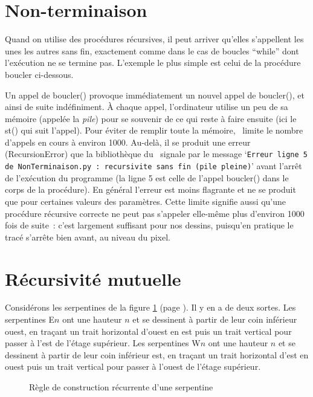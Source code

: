 \section{Non-terminaison}
Quand on utilise des procédures récursives, il peut arriver qu'elles s'appellent les unes les autres
sans fin, exactement comme dans le cas de boucles ``while'' dont l'exécution ne se termine pas. L'exemple le
plus simple est celui de la procédure {\idt boucler} ci-dessous.

\label{prog:NonTerminaison}

Un appel de {\idt boucler()} provoque immédiatement un nouvel appel de {\idt bou\-cler()}, et ainsi
de suite indéfiniment. À chaque appel, l'ordinateur utilise un peu de sa mémoire (appelée la
{\em pile}) pour se souvenir de ce qui reste à faire ensuite (ici le {\idt st()} qui suit
l'appel). Pour éviter de remplir toute la mémoire, \python\ limite le nombre d'appels
en cours à environ 1000. Au-delà, il se produit une erreur ({\idt RecursionError}) que la bibliothèque
du \robot\ signale par le message
`{\tt Erreur ligne 5 de NonTerminaison.py :\ recursivite sans fin (pile pleine)}'
avant l'arrêt de l'exécution du programme (la ligne 5 est celle de l'appel {\idt boucler()} dans le
corps de la procédure). En général 
l'erreur est moins flagrante et ne se produit que pour certaines valeurs des paramètres.
Cette limite signifie aussi qu'une procédure récursive correcte ne peut pas s'appeler
elle-même plus d'environ 1000 fois de suite~: c'est largement suffisant pour nos dessins,
puisqu'en pratique le tracé s'arrête bien avant, au niveau du pixel.

\section{Récursivité mutuelle}
Considérons les serpentines de la figure \ref{fig:serprec} (page \pageref{fig:serprec}). Il y en a
de deux sortes.  Les serpentines 
{\idt E$\scriptscriptstyle n$} ont 
une hauteur $n$ et se dessinent à partir de leur coin inférieur ouest, en traçant un trait 
horizontal d'ouest en est puis un trait vertical pour passer à l'est de l'étage supérieur. 
Les serpentines {\idt W$\scriptscriptstyle n$} ont une hauteur $n$ et se dessinent 
à partir de leur coin inférieur est, en traçant un trait horizontal d'est en ouest puis un trait
vertical pour passer à l'ouest de l'étage supérieur.  
\begin{figure}[htbp]
 \caption{Règle de construction récurrente d'une serpentine}\label{fig:serprec}
\end{figure}

